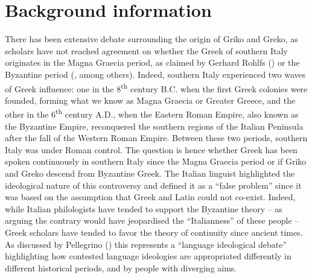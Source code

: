 \documentclass[output=paper,hidelinks]{langscibook}
\begin{document}
\section{Background information}
\label{sec:background}
There has been extensive debate surrounding the origin of Griko and Greko, as scholars have not reached agreement on whether the Greek of southern Italy originates in the Magna Graecia period, as claimed by Gerhard Rohlfs (\citeyear{Rohlfs1924, Rohlfs1974}) or the Byzantine period (\citealt{Falcone1973}, among others). Indeed, southern Italy experienced two waves of Greek influence: one in the 8\textsuperscript{th} century B.C. when the first Greek colonies were founded, forming what we know as Magna Graecia or Greater Greece, and the other in the 6\textsuperscript{th} century A.D., when the Eastern Roman Empire, also known as the Byzantine Empire, reconquered the southern regions of the Italian Peninsula after the fall of the Western Roman Empire. Between these two periods, southern Italy was under Roman control. The question is hence whether Greek has been spoken continuously in southern Italy since the Magna Graecia period or if Griko and Greko descend from Byzantine Greek. The Italian linguist \citet[69]{Fanciullo2001a} highlighted the ideological nature of this controversy and defined it as a ``false problem'' since it was based on the assumption that Greek and Latin could not co-exist. Indeed, while Italian philologists have tended to support the Byzantine theory -- as arguing the contrary would have jeopardised the ``Italianness'' of these people -- Greek scholars have tended to favor the theory of continuity since ancient times. As discussed by Pellegrino (\citeyear{Pellegrino2015, Pellegrino2021}) this represents a ``language ideological debate'' \citep{Blommaert1999} highlighting how contested language ideologies are appropriated differently in different historical periods, and by people with diverging aims. 
\end{document}
